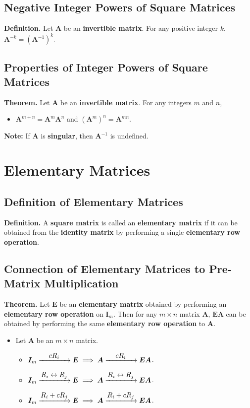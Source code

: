 \documentclass[../ma2001_notes.tex]{subfiles}
\begin{document}
\subsection{Negative Integer Powers of Square Matrices}
\textbf{Definition.} Let \(\bm{A}\) be an \textbf{invertible matrix}. For any positive integer \(k\), \(\bm{A}^{-k}=(\bm{A}^{-1})^k\).

\subsection{Properties of Integer Powers of Square Matrices}
\textbf{Theorem.} Let \(\bm{A}\) be an \textbf{invertible matrix}. For any integers \(m\) and \(n\),
\begin{itemize}
	\item\(\bm{A}^{m+n}=\bm{A}^m\bm{A}^n\) and \((\bm{A}^m)^n=\bm{A}^{mn}\).
\end{itemize}
\textbf{Note:} If \(\bm{A}\) is \textbf{singular}, then \(\bm{A}^{-1}\) is undefined.

\section{Elementary Matrices}
\subsection{Definition of Elementary Matrices}
\textbf{Definition.} A \textbf{square matrix} is called an \textbf{elementary matrix} if it can be obtained from the \textbf{identity matrix} by performing a single \textbf{elementary row operation}.

\subsection{Connection of Elementary Matrices to Pre-Matrix Multiplication}
\textbf{Theorem.} Let \(\bm{E}\) be an \textbf{elementary matrix} obtained by performing an \textbf{elementary row operation} on \(\bm{I}_m\). Then for any \(m\times n\) matrix \(\bm{A}\), \(\bm{EA}\) can be obtained by performing the same \textbf{elementary row operation} to \(\bm{A}\).
\begin{itemize}
	\item Let \(\bm{A}\) be an \(m\times n\) matrix.
	\begin{itemize}
		\item\(\bm{I}_m\ro{$$cR_i$$}\bm{E}\implies\bm{A}\ro{$$cR_i$$}\bm{EA}\).
		\item\(\bm{I}_m\ro{$$R_i\leftrightarrow R_j$$}\bm{E}\implies\bm{A}\ro{$$R_i\leftrightarrow R_j$$}\bm{EA}\).
		\item\(\bm{I}_m\ro{$$R_i+cR_j$$}\bm{E}\implies\bm{A}\ro{$$R_i+cR_j$$}\bm{EA}\).
	\end{itemize}
\end{itemize}
\end{document}
